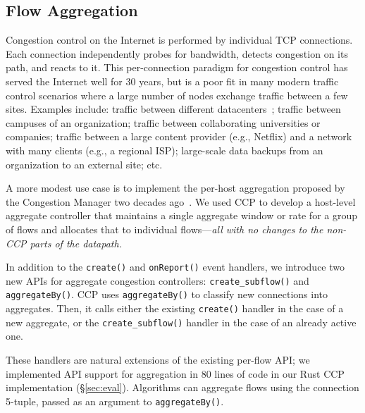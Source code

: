 \subsection{Flow Aggregation}
\label{s:capabilities:agg}

Congestion control on the Internet is performed by individual TCP connections. Each connection independently probes for bandwidth, detects congestion on its path, and reacts to it.
This per-connection paradigm for congestion control has served the Internet well for 30 years, but is a poor fit in many modern traffic control scenarios where a large number of nodes exchange traffic between a few sites.
Examples include: traffic between different datacenters~\cite{b4, swan}; traffic between campuses of an organization; traffic between collaborating universities or companies; traffic between a large content provider (e.g., Netflix) and a network with many clients (e.g., a regional ISP); large-scale data backups from an organization to an external site; etc.

A more modest use case is to implement the per-host aggregation proposed by the
Congestion Manager two decades ago~\cite{cm}. We used CCP to develop a
host-level aggregate controller that maintains a single aggregate window or rate
for a group of flows and allocates that to individual flows---{\em all with no
  changes to the non-CCP parts of the datapath.}

%

 In addition to the \texttt{create()} and \texttt{onReport()} event handlers, we introduce two new APIs for aggregate congestion controllers: \texttt{create\_subflow()} and \texttt{aggregateBy()}.
CCP uses \texttt{aggregateBy()} to classify new connections into aggregates. Then, it calls either the existing \texttt{create()} handler in the case of a new aggregate, or the \texttt{create\_subflow()} handler in the case of an already active one.

These handlers are natural extensions of the existing per-flow API; we implemented API support for aggregation in $80$ lines of code in our Rust CCP implementation (\S\ref{sec:eval}).
Algorithms can aggregate flows using the connection 5-tuple, passed as an argument to \texttt{aggregateBy()}.

